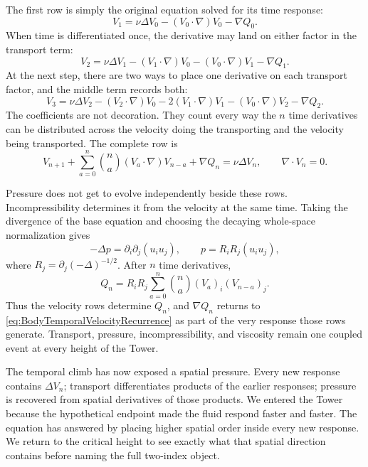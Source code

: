 The first row is simply the original equation solved for its time response:
\[
  V_1
  =\nu\Delta V_0-(V_0\cdot\nabla)V_0-\nabla Q_0.
\]
When time is differentiated once, the derivative may land on either factor in
the transport term:
\[
  V_2
  =\nu\Delta V_1
  -(V_1\cdot\nabla)V_0
  -(V_0\cdot\nabla)V_1
  -\nabla Q_1.
\]
At the next step, there are two ways to place one derivative on each transport
factor, and the middle term records both:
\[
  V_3
  =\nu\Delta V_2
  -(V_2\cdot\nabla)V_0
  -2(V_1\cdot\nabla)V_1
  -(V_0\cdot\nabla)V_2
  -\nabla Q_2.
\]
The coefficients are not decoration.  They count every way the \(n\) time
derivatives can be distributed across the velocity doing the transporting and
the velocity being transported.  The complete row is
\begin{equation}\label{eq:BodyTemporalVelocityRecurrence}
  V_{n+1}
  +\sum_{a=0}^{n}\binom{n}{a}(V_a\cdot\nabla)V_{n-a}
  +\nabla Q_n
  =\nu\Delta V_n,
  \qquad
  \nabla\cdot V_n=0.
\end{equation}

Pressure does not get to evolve independently beside these rows.
Incompressibility determines it from the velocity at the same time.  Taking
the divergence of the base equation and choosing the decaying whole-space
normalization gives
\begin{equation}\label{eq:PressureNormalization}
  -\Delta p=\partial_i\partial_j(u_i u_j),
  \qquad
  p=R_iR_j(u_i u_j),
\end{equation}
where \(R_j=\partial_j(-\Delta)^{-1/2}\).  After \(n\) time derivatives,
\begin{equation}\label{eq:BodyTemporalPressureRecurrence}
  Q_n
  =R_iR_j
  \sum_{a=0}^{n}\binom{n}{a}(V_a)_i(V_{n-a})_j.
\end{equation}
Thus the velocity rows determine \(Q_n\), and \(\nabla Q_n\) returns to
\eqref{eq:BodyTemporalVelocityRecurrence} as part of the very response those
rows generate.  Transport, pressure, incompressibility, and viscosity remain
one coupled event at every height of the Tower.

The temporal climb has now exposed a spatial pressure.  Every new response
contains \(\Delta V_n\); transport differentiates products of the earlier
responses; pressure is recovered from spatial derivatives of those products.
We entered the Tower because the hypothetical endpoint made the fluid respond
faster and faster.  The equation has answered by placing higher spatial order
inside every new response.  We return to the critical height to see exactly
what that spatial direction contains before naming the full two-index object.
